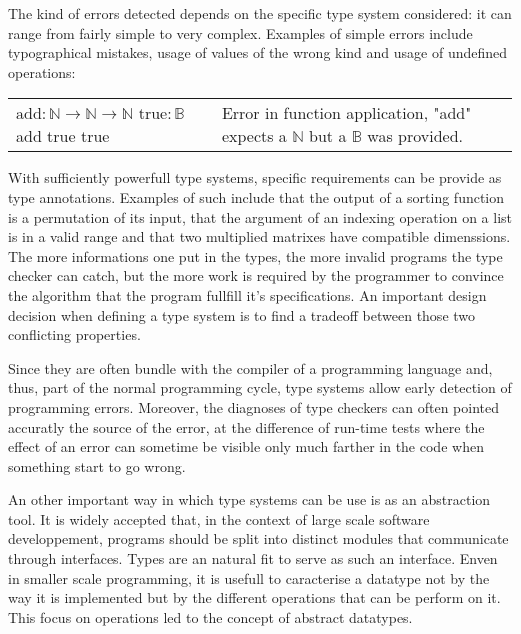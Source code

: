 The kind of errors detected depends on the specific type system considered: it can range from
fairly simple to very complex. Examples of simple errors include typographical mistakes, usage of
values of the wrong kind and usage of undefined operations:

\begin{center}
  \begin{tabular}{m{3.5cm} | m{5.5cm}}
    $\text{add} : \mathbb{N} \to \mathbb{N} \to \mathbb{N}$ \newline
    $\text{true} : \mathbb{B}$ \newline
    add true true
    & Error in function application, "add" expects a $\mathbb{N}$ but a $\mathbb{B}$ was provided.
  \end{tabular}
\end{center}

With sufficiently powerfull type systems, specific requirements can be provide as type annotations.
Examples of such include that the output of a sorting function is a permutation of its input, that
the argument of an indexing operation on a list is in a valid range and that two multiplied matrixes
have compatible dimenssions. The more informations one put in the types, the more invalid programs
the type checker can catch, but the more work is required by the programmer to convince the
algorithm that the program fullfill it's specifications. An important design decision when defining
a type system is to find a tradeoff between those two conflicting properties.

Since they are often bundle with the compiler of a programming language and, thus, part of the
normal programming cycle, type systems allow early detection of programming errors. Moreover, the
diagnoses of type checkers can often pointed accuratly the source of the error, at the difference of
run-time tests where the effect of an error can sometime be visible only much farther in the code
when something start to go wrong.

An other important way in which type systems can be use is as an abstraction tool. It is widely
accepted that, in the context of large scale software developpement, programs should be split into
distinct modules that communicate through interfaces. Types are an natural fit to serve as such an
interface. Enven in smaller scale programming, it is usefull to caracterise a datatype not by the
way it is implemented but by the different operations that can be perform on it. This focus on
operations led to the concept of abstract datatypes.


